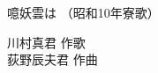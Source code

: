 \documentclass[10pt,b5j]{tarticle} %
\begin{document}
\begin{minipage}[c]{0.7\hsize} %
    \begin{center}
        {\LARGE
            噫妖雲は %
        }
        {\small 
            （昭和10年寮歌） %
        }
    \end{center}
\end{minipage}
\begin{minipage}[c]{0.3\hsize} %
    \begin{flushright} %
        川村真君 作歌\\荻野辰夫君 作曲 %
    \end{flushright}
\end{minipage}
\end{document}
